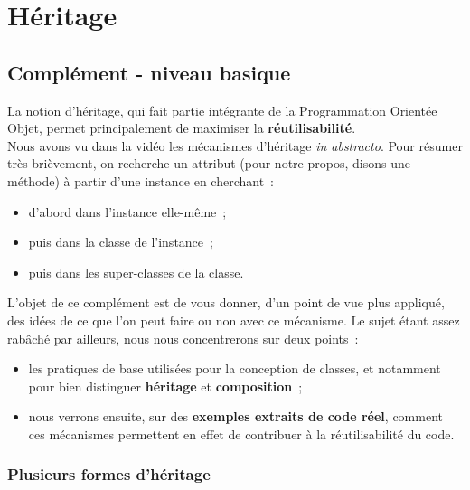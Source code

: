     \hypertarget{huxe9ritage}{%
\section{Héritage}\label{huxe9ritage}}

    \hypertarget{compluxe9ment---niveau-basique}{%
\subsection{Complément - niveau
basique}\label{compluxe9ment---niveau-basique}}

    La notion d'héritage, qui fait partie intégrante de la Programmation
Orientée Objet, permet principalement de maximiser la
\textbf{réutilisabilité}.\\

Nous avons vu dans la vidéo les mécanismes d'héritage \emph{in
abstracto}. Pour résumer très brièvement, on recherche un attribut (pour
notre propos, disons une méthode) à partir d'une instance en cherchant~:

\begin{itemize}
\tightlist
\item
  d'abord dans l'instance elle-même~;
\item
  puis dans la classe de l'instance~;
\item
  puis dans les super-classes de la classe.
\end{itemize}

    L'objet de ce complément est de vous donner, d'un point de vue plus
appliqué, des idées de ce que l'on peut faire ou non avec ce mécanisme.
Le sujet étant assez rabâché par ailleurs, nous nous concentrerons sur
deux points~:

\begin{itemize}
\tightlist
\item
  les pratiques de base utilisées pour la conception de classes, et
  notamment pour bien distinguer \textbf{héritage} et
  \textbf{composition}~;
\item
  nous verrons ensuite, sur des \textbf{exemples extraits de code réel},
  comment ces mécanismes permettent en effet de contribuer à la
  réutilisabilité du code.
\end{itemize}

    \hypertarget{plusieurs-formes-dhuxe9ritage}{%
\subsubsection{Plusieurs formes
d'héritage}\label{plusieurs-formes-dhuxe9ritage}}

